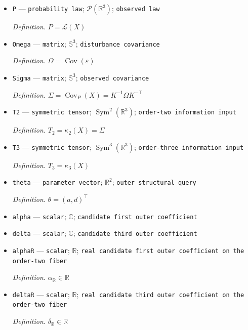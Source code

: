 \documentclass{article}
\begin{document}
\begin{itemize}
  \par\smallskip\noindent\emph{Definition.} \(X=K^{-1}\varepsilon\), equivalently \(KX=\varepsilon\)
  \item \texttt{P} --- \texttt{probability law}; \(\mathcal P(\mathbb R^3)\); \texttt{observed law}
  \par\smallskip\noindent\emph{Definition.} \(P=\mathcal L(X)\)
  \item \texttt{Omega} --- \texttt{matrix}; \(\mathbb S^3\); \texttt{disturbance covariance}
  \par\smallskip\noindent\emph{Definition.} \(\Omega=\operatorname{Cov}(\varepsilon)\)
  \item \texttt{Sigma} --- \texttt{matrix}; \(\mathbb S^3\); \texttt{observed covariance}
  \par\smallskip\noindent\emph{Definition.} \(\Sigma=\operatorname{Cov}_P(X)=K^{-1}\Omega K^{-\top}\)
  \item \texttt{T2} --- \texttt{symmetric tensor}; \(\operatorname{Sym}^2(\mathbb R^3)\); \texttt{order-\allowbreak{}two information input}
  \par\smallskip\noindent\emph{Definition.} \(T_2=\kappa_2(X)=\Sigma\)
  \item \texttt{T3} --- \texttt{symmetric tensor}; \(\operatorname{Sym}^3(\mathbb R^3)\); \texttt{order-\allowbreak{}three information input}
  \par\smallskip\noindent\emph{Definition.} \(T_3=\kappa_3(X)\)
  \item \texttt{theta} --- \texttt{parameter vector}; \(\mathbb R^2\); \texttt{outer structural query}
  \par\smallskip\noindent\emph{Definition.} \(\theta=(a,d)^\top\)
  \item \texttt{alpha} --- \texttt{scalar}; \(\mathbb C\); \texttt{candidate first outer coefficient}
  \item \texttt{delta} --- \texttt{scalar}; \(\mathbb C\); \texttt{candidate third outer coefficient}
  \item \texttt{alphaR} --- \texttt{scalar}; \(\mathbb R\); \texttt{real candidate first outer coefficient on the order-\allowbreak{}two fiber}
  \par\smallskip\noindent\emph{Definition.} \(\alpha_{\mathbb R}\in\mathbb R\)
  \item \texttt{deltaR} --- \texttt{scalar}; \(\mathbb R\); \texttt{real candidate third outer coefficient on the order-\allowbreak{}two fiber}
  \par\smallskip\noindent\emph{Definition.} \(\delta_{\mathbb R}\in\mathbb R\)

\end{itemize}
\end{document}

